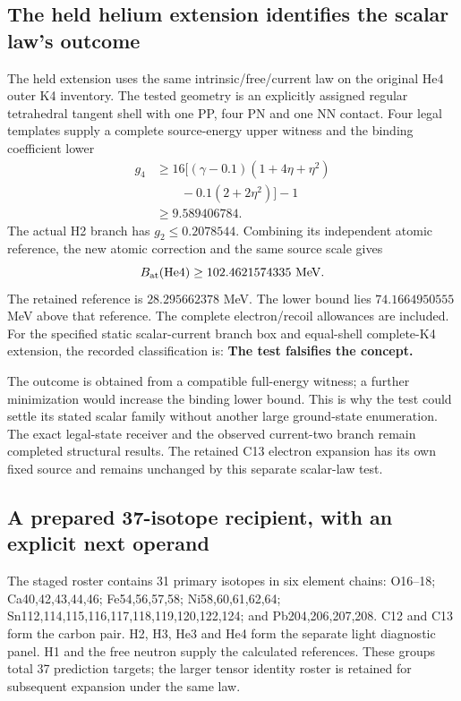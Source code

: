 \subsection{The held helium extension identifies the scalar law's outcome}

The held extension uses the same intrinsic/free/current law on the original He4 outer K4 inventory. The tested geometry is an explicitly assigned regular tetrahedral tangent shell with one PP, four PN and one NN contact. Four legal templates supply a complete source-energy upper witness and the binding coefficient lower
\begin{equation}
\begin{aligned}
g_4&\geq16\bigl[(\gamma-0.1)(1+4\eta+\eta^2)\\
&\qquad-0.1(2+2\eta^2)\bigr]-1\\
&\geq9.589406784.
\end{aligned}
\end{equation}
The actual H2 branch has $g_2\leq0.2078544$. Combining its independent atomic reference, the new atomic correction and the same source scale gives
\begin{equation}
B_{\rm at}(\mathrm{He4})\geq102.4621574335\ \mathrm{MeV}.
\end{equation}
The retained reference is $28.295662378$ MeV. The lower bound lies $74.1664950555$ MeV above that reference. The complete electron/recoil allowances are included. For the specified static scalar-current branch box and equal-shell complete-K4 extension, the recorded classification is: \textbf{The test falsifies the concept.}

The outcome is obtained from a compatible full-energy witness; a further minimization would increase the binding lower bound. This is why the test could settle its stated scalar family without another large ground-state enumeration. The exact legal-state receiver and the observed current-two branch remain completed structural results. The retained C13 electron expansion has its own fixed source and remains unchanged by this separate scalar-law test.

\subsection{A prepared 37-isotope recipient, with an explicit next operand}

The staged roster contains 31 primary isotopes in six element chains: O16--18; Ca40,42,43,44,46; Fe54,56,57,58; Ni58,60,61,62,64; Sn112,114,115,116,117,118,119,120,122,124; and Pb204,206,207,208. C12 and C13 form the carbon pair. H2, H3, He3 and He4 form the separate light diagnostic panel. H1 and the free neutron supply the calculated references. These groups total 37 prediction targets; the larger tensor identity roster is retained for subsequent expansion under the same law.

